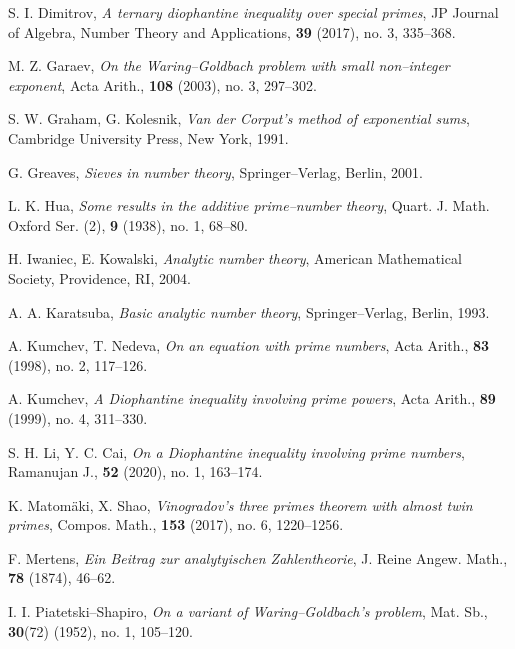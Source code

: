 \documentclass[a4paper,oneside,11pt]{article}%
\numberwithin{equation}{section}
\begin{document}
\begin{thebibliography}{99}
S. I. Dimitrov, \textit{A ternary diophantine inequality over special primes},
             JP Journal of Algebra, Number Theory and Applications, \textbf{39} (2017), no. 3, 335--368.

M. Z. Garaev, \textit{On the Waring--Goldbach problem with small non--integer exponent},
                                      Acta Arith., \textbf{108} (2003), no. 3, 297--302.

S. W. Graham, G. Kolesnik, \textit{Van der Corput's method of exponential sums},
                             Cambridge University Press, New York, 1991.

G. Greaves, \textit{Sieves in number theory}, Springer--Verlag, Berlin, 2001.


L. K. Hua, \textit{Some results in the additive prime--number theory},
                                    Quart. J. Math. Oxford Ser. (2), \textbf{9} (1938), no. 1, 68--80.

H. Iwaniec, E. Kowalski, \textit{Analytic number theory},
                                    American Mathematical Society, Providence, RI, 2004.

A. A. Karatsuba, \textit{Basic analytic number theory}, Springer--Verlag, Berlin, 1993.


A. Kumchev, T. Nedeva, \textit{On an equation with prime numbers},
                                Acta Arith., \textbf{83} (1998), no. 2, 117--126.

A. Kumchev, \textit{A Diophantine inequality involving prime powers},
                                Acta Arith., \textbf{89} (1999), no. 4, 311--330.

S. H. Li, Y. C. Cai, \textit{On a Diophantine inequality involving prime numbers},
                                Ramanujan J., \textbf{52} (2020), no. 1, 163--174.

K. Matom\"{a}ki, X. Shao, \textit{Vinogradov's three primes theorem with almost twin primes},
                                Compos. Math., \textbf{153} (2017), no. 6, 1220--1256.

F. Mertens, \textit{Ein Beitrag zur analytyischen Zahlentheorie},
                                     J. Reine Angew. Math., \textbf{78} (1874), 46--62.

I. I. Piatetski--Shapiro, \textit{On a variant of Waring--Goldbach's problem},
                                       Mat. Sb., \textbf{30}(72) (1952), no. 1, 105--120.


\end{thebibliography}
\end{document}
